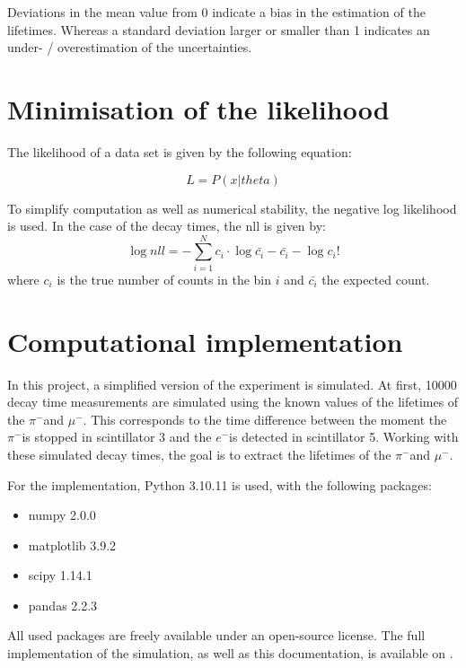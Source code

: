 \documentclass[11pt, a4paper, oneside]{book}
\newcommand{\electron}{$e^{-}$}
\newcommand{\pion}{$\pi^{-}$}
\newcommand{\muon}{$\mu^{-}$}
\begin{document}
Deviations in the mean value from 0 indicate a bias in the estimation of the lifetimes. Whereas a standard deviation larger or smaller than 1 indicates an under- / overestimation of the uncertainties. 

\section{Minimisation of the likelihood}
The likelihood of a data set is given by the following equation:

\begin{equation}
    L = P(x | theta)
    \label{eq:likelihood_base}
\end{equation}

To simplify computation as well as numerical stability, the negative log likelihood is used. In the case of the decay times, the nll is given by:
\begin{equation}
  \log{nll} = -\sum_{i=1}^{N} c_i \cdot \log{\bar{c_i}} - \bar{c_i} - \log{c_i!}
  \label{eq:likelihood}
\end{equation}
where $c_i$ is the true number of counts in the bin $i$ and $\bar{c_i}$ the expected count.

\section{Computational implementation}
In this project, a simplified version of the experiment is simulated. At first, \num{10000} decay time measurements are simulated using the known values of the lifetimes of the \pion and \muon. This corresponds to the time difference between the moment the \pion is stopped in scintillator 3 and the \electron is detected in scintillator 5. Working with these simulated decay times, the goal is to extract the lifetimes of the \pion and \muon.

For the implementation, Python 3.10.11 is used, with the following packages:
\begin{itemize}
    \item numpy 2.0.0
    \item matplotlib 3.9.2
    \item scipy 1.14.1
    \item pandas 2.2.3
\end{itemize}
All used packages are freely available under an open-source license. 
The full implementation of the simulation, as well as this documentation, is available on \cite{GitHub}.

\end{document}
